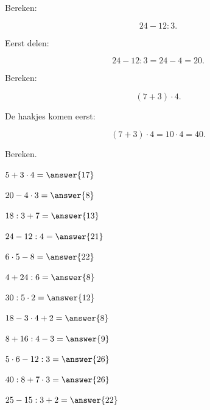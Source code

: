 \documentclass{ximera}
\begin{document}
\begin{voorbeeld}

Bereken:

\[
24-12:3.
\]

Eerst delen:

\[
24-12:3
=
24-4
=
20.
\]

\end{voorbeeld}


\begin{voorbeeld}

Bereken:

\[
(7+3)\cdot4.
\]

De haakjes komen eerst:

\[
(7+3)\cdot4
=
10\cdot4
=
40.
\]

\end{voorbeeld}


\begin{oefening}{\oefB\ESS}

Bereken.

\begin{question} \(5+3\cdot4=\answer{17}\) \end{question}

\begin{question} \(20-4\cdot3=\answer{8}\) \end{question}

\begin{question} \(18:3+7=\answer{13}\) \end{question}

\begin{question} \(24-12:4=\answer{21}\) \end{question}

\begin{question} \(6\cdot5-8=\answer{22}\) \end{question}

\begin{question} \(4+24:6=\answer{8}\) \end{question}

\begin{question} \(30:5\cdot2=\answer{12}\) \end{question}

\begin{question} \(18-3\cdot4+2=\answer{8}\) \end{question}

\begin{question} \(8+16:4-3=\answer{9}\) \end{question}

\begin{question} \(5\cdot6-12:3=\answer{26}\) \end{question}

\begin{question} \(40:8+7\cdot3=\answer{26}\) \end{question}

\begin{question} \(25-15:3+2=\answer{22}\) \end{question}

\end{oefening}
\end{document}
